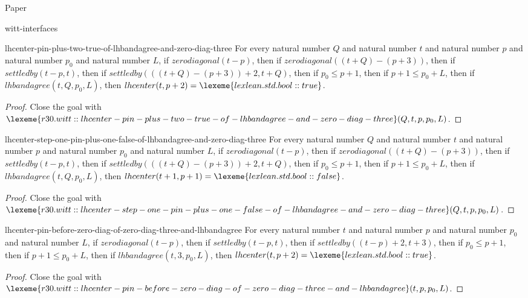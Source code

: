 \begin{lexlean}{Paper}
\begin{section}{witt-interfaces}
  \begin{theorem}{lhcenter-pin-plus-two-true-of-lhbandagree-and-zero-diag-three}
  For every natural number \(Q\) and natural number \(t\) and natural number \(p\) and natural number \(p_0\) and natural number \(L\), if \(zerodiagonal(t - p)\), then if \(zerodiagonal((t + Q) - (p + 3))\), then if \(settledby(t - p, t)\), then if \(settledby(((t + Q) - (p + 3)) + 2, t + Q)\), then if \(p_0 ≤ p + 1\), then if \(p + 1 ≤ p_0 + L\), then if \(lhbandagree(t, Q, p_0, L)\), then \(lhcenter(t, p + 2) = \lexeme{lexlean.std.bool::true}\).
  \begin{proof}
  Close the goal with \(\lexeme{r30.witt::lhcenter-pin-plus-two-true-of-lhbandagree-and-zero-diag-three}(Q, t, p, p_0, L)\).
  \end{proof}
  \end{theorem}

  \begin{theorem}{lhcenter-step-one-pin-plus-one-false-of-lhbandagree-and-zero-diag-three}
  For every natural number \(Q\) and natural number \(t\) and natural number \(p\) and natural number \(p_0\) and natural number \(L\), if \(zerodiagonal(t - p)\), then if \(zerodiagonal((t + Q) - (p + 3))\), then if \(settledby(t - p, t)\), then if \(settledby(((t + Q) - (p + 3)) + 2, t + Q)\), then if \(p_0 ≤ p + 1\), then if \(p + 1 ≤ p_0 + L\), then if \(lhbandagree(t, Q, p_0, L)\), then \(lhcenter(t + 1, p + 1) = \lexeme{lexlean.std.bool::false}\).
  \begin{proof}
  Close the goal with \(\lexeme{r30.witt::lhcenter-step-one-pin-plus-one-false-of-lhbandagree-and-zero-diag-three}(Q, t, p, p_0, L)\).
  \end{proof}
  \end{theorem}

  \begin{theorem}{lhcenter-pin-before-zero-diag-of-zero-diag-three-and-lhbandagree}
  For every natural number \(t\) and natural number \(p\) and natural number \(p_0\) and natural number \(L\), if \(zerodiagonal(t - p)\), then if \(settledby(t - p, t)\), then if \(settledby((t - p) + 2, t + 3)\), then if \(p_0 ≤ p + 1\), then if \(p + 1 ≤ p_0 + L\), then if \(lhbandagree(t, 3, p_0, L)\), then \(lhcenter(t, p + 2) = \lexeme{lexlean.std.bool::true}\).
  \begin{proof}
  Close the goal with \(\lexeme{r30.witt::lhcenter-pin-before-zero-diag-of-zero-diag-three-and-lhbandagree}(t, p, p_0, L)\).
  \end{proof}
  \end{theorem}


\end{section}
\end{lexlean}
